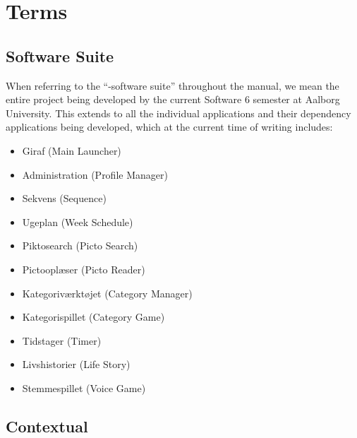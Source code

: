 
\chapter{Terms}

\section{\giraf Software Suite}
\noindent When referring to the ``\giraf-software suite'' throughout the manual, we mean the entire \giraf project being developed by the current Software 6 semester at Aalborg University. This extends to all the individual applications and their dependency applications being developed, which at the current time of writing includes: 

\begin{itemize}
    \item Giraf (Main Launcher)
    \item Administration (Profile Manager)
    \item Sekvens (Sequence)
    \item Ugeplan (Week Schedule)
    \item Piktosearch (Picto Search)
    \item Pictooplæser (Picto Reader)
    \item Kategoriværktøjet (Category Manager)
    \item Kategorispillet (Category Game)
    \item Tidstager (Timer)
    \item Livshistorier (Life Story)
    \item Stemmespillet (Voice Game)
\end{itemize}

\section{Contextual}

